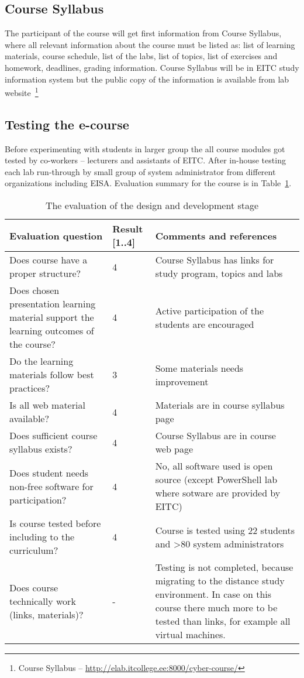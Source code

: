 \subsection{Course Syllabus}
\label{Course Syllabus}
The participant of the course will get first information from Course Syllabus, where all relevant information about the course must be listed as: list of learning materials, course schedule, list of the labs, list of topics, list of exercises and homework, deadlines, grading information. Course Syllabus will be in \gls{EITC} study information system but the public copy of the information is available from lab website~\footnote{Course Syllabus -- \url{http://elab.itcollege.ee:8000/cyber-course/}}

\subsection{Testing the e-course}
Before experimenting with students in larger group the all course modules got tested by co-workers -- lecturers and assistants of \gls{EITC}. After in-house testing each lab run-through by small group of system administrator from different organizations including \gls{EISA}. Evaluation summary for the course is in Table~\ref{table:desing_develop_evaluation}.
\begin{table}[h]
\centering
\caption{The evaluation of the design and development stage }
{ \small 
\begin{tabular}{|p{6cm}|p{2cm}|p{5cm}|}
\hline 
\color{blue} Evaluation question & \color{blue} Result [1..4] & \color{blue} Comments and references \\
\hline
Does course have a proper structure? 
& 4  &  Course Syllabus has links for study program, topics and labs  \\ 
\hline
Does chosen presentation learning material support the learning outcomes of the course? 
& 4  &  Active participation of the students are encouraged \\ 
\hline

Do the learning materials follow best practices? 
& 3  &  Some materials needs improvement \\ 
\hline
Is all web material available? 
& 4  &  Materials are in course syllabus page \\ 
\hline
Does sufficient course syllabus exists? 
& 4  &  Course Syllabus are in course web page \\ 
\hline 
Does student needs non-free software for participation?
& 4 &  No, all software used is open source (except PowerShell lab where sotware are provided by \gls{EITC}) \\ 
\hline 
Is course tested before including to the curriculum?
& 4 & Course is tested using 22 students and >80 system administrators \\ 
\hline
Does course technically work (links, materials)?
& - & Testing is not completed, because migrating to the distance study environment. In case on this course there much more to be tested than links, for example all virtual machines.\\ 
\hline 
\end{tabular} 
}
\label{table:desing_develop_evaluation}
\end{table}


